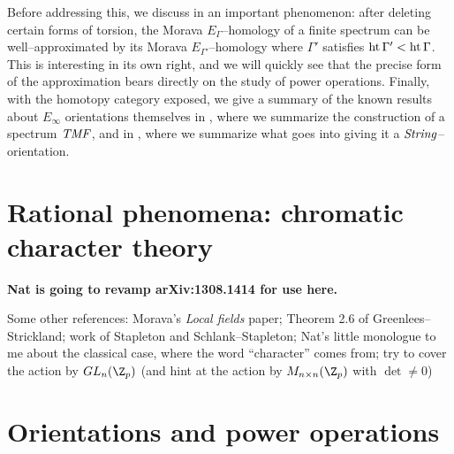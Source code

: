 \noindent Before addressing this, we discuss in  an important phenomenon: after deleting certain forms of torsion, the Morava $E_\Gamma$--homology of a finite spectrum can be well--approximated by its Morava $E_{\Gamma'}$--homology where $\Gamma'$ satisfies $\operatorname{ht}{\Gamma'} < \operatorname{ht}{\Gamma}$.  This is interesting in its own right, and we will quickly see that the precise form of the approximation bears directly on the study of power operations.  Finally, with the homotopy category exposed, we give a summary of the known results about $E_\infty$ orientations themselves in , where we summarize the construction of a spectrum $\mathit{TMF}$, and in , where we summarize what goes into giving it a $\mathit{String}$--orientation.













\section{Rational phenomena: chromatic character theory}\label{CharacterTheorySection}

\begin{center}
\textbf{\Large Nat is going to revamp arXiv:1308.1414 for use here.}
\end{center}

Some other references:
Morava's \textit{Local fields} paper; 
Theorem 2.6 of Greenlees--Strickland;
work of Stapleton and Schlank--Stapleton;
Nat's little monologue to me about the classical case, where the word ``character'' comes from;
try to cover the action by $GL_n(\Z_p)$ (and hint at the action by $M_{n \times n}(\Z_p)$ with $\det \ne 0$)












\section{Orientations and power operations}\label{PowerOpnsSection}


